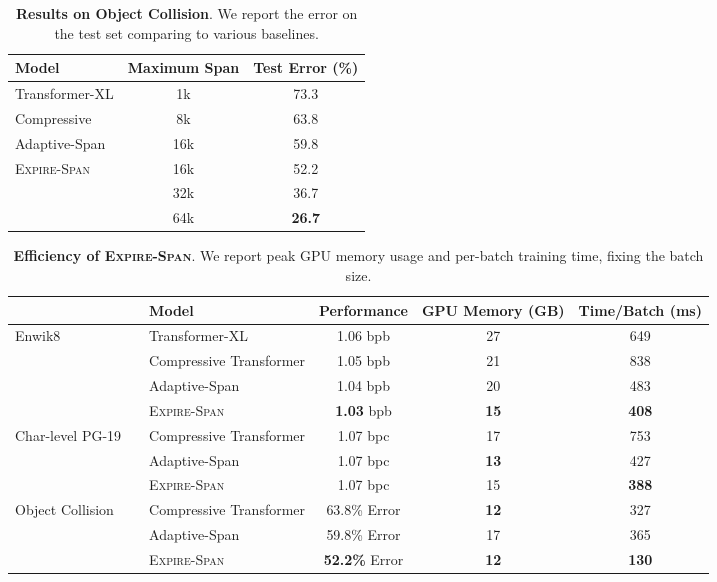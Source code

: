 \begin{table}[t]
    \centering
    \begin{tabular}{lcc}
    \toprule
    Model & Maximum Span & Test Error (\%) \\
    \midrule
    Transformer-XL & 1k & 73.3 \\
    Compressive & 8k & 63.8 \\
    Adaptive-Span & 16k & 59.8 \\
    \midrule 
    \multirow{3}{*}{\textsc{Expire-Span}}  & 16k & 52.2 \\
     & 32k & 36.7 \\ 
     & 64k & \bf 26.7 \\ 
    \bottomrule
    \end{tabular}
    \caption{
    \textbf{Results on Object Collision}. We report the error on the test set comparing to various baselines.
    }
    \label{tab:colliding}
\end{table}


\begin{table*}[t]
    \centering
    \renewcommand{\arraystretch}{0.8}
    \begin{tabular}{lllccc}
    \toprule
    && Model &  Performance & GPU Memory (GB) & Time/Batch (ms) \\
    \midrule
    \multirow{4}{*}{Enwik8} && Transformer-XL  & 1.06 bpb & 27 & 649 \\ 
    && Compressive Transformer  & 1.05 bpb & 21 & 838 \\ 
    && Adaptive-Span & 1.04 bpb & 20 & 483 \\ 
    && \textsc{Expire-Span} & {\bf  1.03} bpb & \bf  15 & \bf 408 \\ 
    \midrule 
    \multirow{3}{*}{Char-level PG-19} && Compressive Transformer  & 1.07 bpc & 17 & 753 \\ 
    && Adaptive-Span & 1.07 bpc & \bf 13 & 427 \\ 
    && \textsc{Expire-Span} &  1.07 bpc & 15 & \bf 388 \\ 
    \midrule 
    \multirow{3}{*}{Object Collision} && Compressive Transformer  & 63.8\% Error & \bf 12 & 327 \\ 
    && Adaptive-Span & 59.8\% Error & 17 & 365 \\ 
    && \textsc{Expire-Span} & {\bf  52.2\%} Error & \bf  12 & \bf  130 \\ 
    \bottomrule
    \end{tabular}
    \caption{
    \textbf{Efficiency of \textsc{Expire-Span}}. We report peak GPU memory usage and per-batch training time, fixing the batch size. 
    }
    \label{tab:efficiency}
    \vspace{-2mm}
\end{table*}

